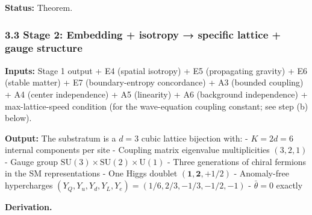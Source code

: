 \documentclass[
]{article}
\begin{document}
\textbf{Status:} Theorem.

\hypertarget{stage-2-embedding-isotropy-specific-lattice-gauge-structure}{%
\subsubsection{3.3 Stage 2: Embedding + isotropy → specific lattice +
gauge
structure}\label{stage-2-embedding-isotropy-specific-lattice-gauge-structure}}

\textbf{Inputs:} Stage 1 output + E4 (spatial isotropy) + E5
(propagating gravity) + E6 (stable matter) + E7 (boundary-entropy
concordance) + A3 (bounded coupling) + A4 (center independence) + A5
(linearity) + A6 (background independence) + max-lattice-speed condition
(for the wave-equation coupling constant; see step (b) below).

\textbf{Output:} The substratum is a \(d = 3\) cubic lattice bijection
with: - \(K = 2d = 6\) internal components per site - Coupling matrix
eigenvalue multiplicities \((3, 2, 1)\) - Gauge group
\(\text{SU}(3) \times \text{SU}(2) \times \text{U}(1)\) - Three
generations of chiral fermions in the SM representations - One Higgs
doublet \((\mathbf{1}, \mathbf{2}, +1/2)\) - Anomaly-free hypercharges
\((Y_Q, Y_u, Y_d, Y_L, Y_e) = (1/6, 2/3, -1/3, -1/2, -1)\) -
\(\bar\theta = 0\) exactly

\textbf{Derivation.}
\end{document}

